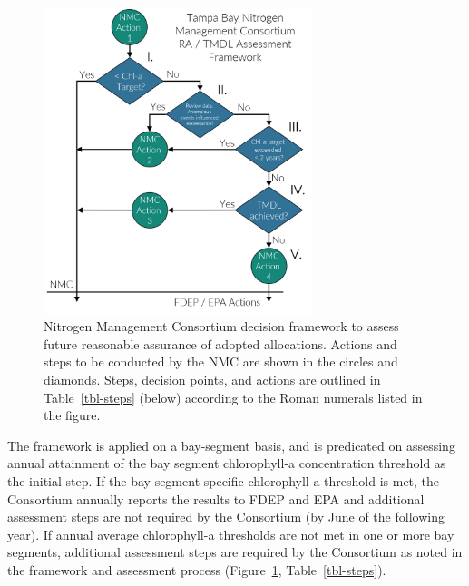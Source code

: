 \documentclass[
  letterpaper,
  DIV=11,
  numbers=noendperiod]{scrreprt}
\begin{document}
\begin{figure}

{\centering \includegraphics[width=0.7\textwidth,height=\textheight]{./www/decisionframework.png}

}

\caption{\label{fig-decision}Nitrogen Management Consortium decision
framework to assess future reasonable assurance of adopted allocations.
Actions and steps to be conducted by the NMC are shown in the circles
and diamonds. Steps, decision points, and actions are outlined in
Table~\ref{tbl-steps} (below) according to the Roman numerals listed in
the figure.}

\end{figure}

The framework is applied on a bay-segment basis, and is predicated on
assessing annual attainment of the bay segment chlorophyll-a
concentration threshold as the initial step. If the bay segment-specific
chlorophyll-a threshold is met, the Consortium annually reports the
results to FDEP and EPA and additional assessment steps are not required
by the Consortium (by June of the following year). If annual average
chlorophyll-a thresholds are not met in one or more bay segments,
additional assessment steps are required by the Consortium as noted in
the framework and assessment process (Figure~\ref{fig-decision},
Table~\ref{tbl-steps}).
\end{document}
